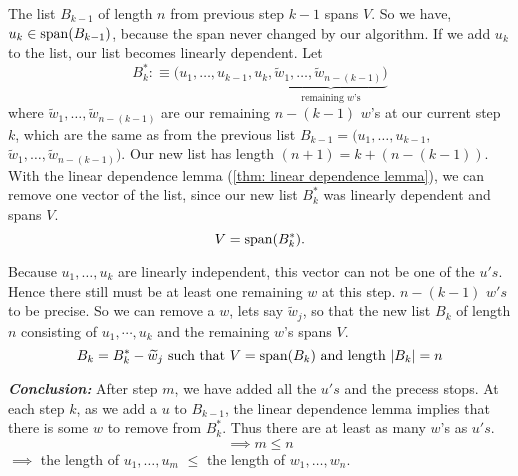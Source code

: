 \begin{prf}
   The list $B_{k-1}$ of length $n$ from previous step $k-1$ spans $V$. So we have, $u_k \in \operatorname{span} (B_{k-1})$, because the span never changed by our algorithm. If we add $u_k$ to the list, our list becomes linearly dependent. Let
  \begin{equation*}
    B_k^* :\equiv (u_1, \ldots, u_{k-1}, u_k, \underbrace{\widetilde w_{1}, \ldots, \widetilde w_{n-(k-1)})}_{\text{remaining $w$'s}}
  \end{equation*}
  where $\widetilde w_{1}, \ldots, \widetilde w_{n-(k-1)}$ are our remaining $n-(k-1)$ $w$'s at our current step $k$, which are the same as from the previous list $B_{k-1}$$=$$(u_1, \ldots,u_{k-1},$$ \widetilde w_{1}, \ldots, \widetilde w_{n-(k-1)})$. Our new list has length $(n+1) = k + (n-(k-1))$. With the linear dependence lemma (\ref{thm: linear dependence lemma}), we can remove one vector of the list, since our new list $B_{k}^*$ was linearly dependent and spans $V$.
  \begin{equation*}
    V=\operatorname{span} (B_{k}^*).
  \end{equation*}

  Because $u_1, \ldots, u_k$ are linearly independent, this vector can not be one of the $u's$. Hence there still must be at least one remaining $w$ at this step. $n-(k-1)$ $w's$ to be precise. So we can remove a $w$, lets say $\widetilde w_j$, so that the new list $B_k$ of length $n$ consisting of $u_1, \cdots, u_k$ and the remaining $w$'s spans $V$.
  \begin{equation*}
    B_k = B_k^* - \widetilde w_j$ such that $ V=\myspan{B_k}$ and length $|B_k|=n
  \end{equation*}

  \emph{\bfseries Conclusion:} After step $m$, we have added all the $u's$ and the precess stops. At each step $k$, as we add a $u$ to $B_{k-1}$, the linear dependence lemma implies that there is some $w$ to remove from $B_{k}^*$. Thus there are at least as many $w$'s as $u's$.
  \begin{equation*}
    \implies m \leq n
  \end{equation*}
  $\implies$ the length of $u_1, \ldots, u_m$ $\leq$ the length of $w_1, \ldots, w_n$.
\end{prf}

